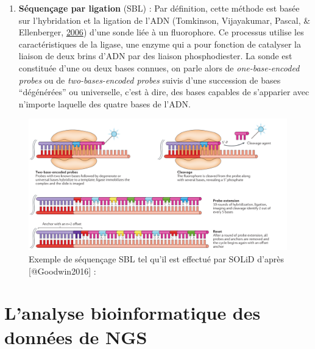 \documentclass[12pt,twoside]{reedthesis}
\providecommand{\tightlist}{%
  \setlength{\itemsep}{0pt}\setlength{\parskip}{0pt}}
\theoremstyle{definition}
\theoremstyle{definition}
\theoremstyle{remark}
\begin{document}
  \begin{enumerate}
  \def\labelenumi{\arabic{enumi}.}
  \setcounter{enumi}{1}
  \tightlist
  \item
    \textbf{Séquençage par ligation} (SBL) : Par définition, cette méthode
    est basée sur l'hybridation et la ligation de l'ADN (Tomkinson,
    Vijayakumar, Pascal, \& Ellenberger,
    \protect\hyperlink{ref-Tomkinson2006}{2006}) d'une sonde liée à un
    fluorophore. Ce processus utilise les caractéristiques de la ligase,
    une enzyme qui a pour fonction de catalyser la liaison de deux brins
    d'ADN par des liaison phosphodiester. La sonde est constituée d'une ou
    deux bases connues, on parle alors de \emph{one-base-encoded probes}
    ou de \emph{two-bases-encoded probes} suivis d'une succession de bases
    ``dégénérées'' ou universelle, c'est à dire, des bases capables de
    s'apparier avec n'importe laquelle des quatre bases de l'ADN.
  \end{enumerate}
  
  \begin{figure}
  
  {\centering \includegraphics[scale=.26]{figure/SBL_seq_solid} 
  
  }
  
  \caption[Exemple de séquençage SBL tel qu'il est effectué par SOLiD]{Exemple de séquençage SBL tel qu'il est effectué par SOLiD d'après [@Goodwin2016] : }\label{fig:sblSeq}
  \end{figure}
  
  \newpage  
  
  \section{L'analyse bioinformatique des données de
  NGS}\label{lanalyse-bioinformatique-des-donnees-de-ngs}
  
\end{document}
